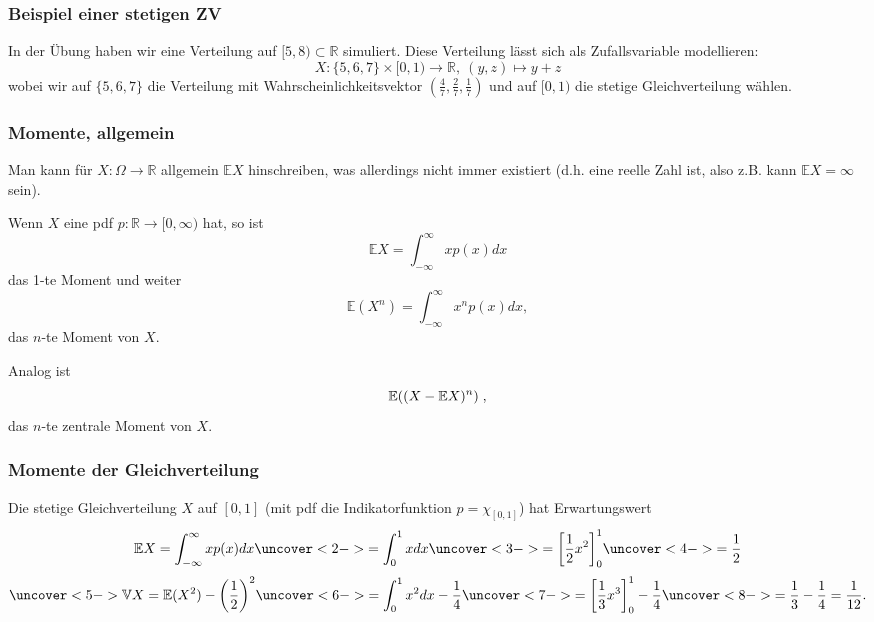 \begin{frame}
  \frametitle{Beispiel einer stetigen ZV}
  \vspace{-0.5cm}
  In der Übung haben wir eine Verteilung auf $[5,8) \subset \mathbb{R}$ simuliert.
  Diese Verteilung lässt sich als Zufallsvariable modellieren:
  \[X \colon \{5,6,7\} \times [0,1) \to \mathbb{R},\ (y,z) \mapsto y+z\]
  wobei wir auf $\{5,6,7\}$ die Verteilung mit Wahrscheinlichkeitsvektor $(\frac{4}{7},\frac{2}{7},\frac{1}{7})$ und auf $[0,1)$ die stetige Gleichverteilung wählen.
  
  \smallskip

  \uncover<2->{
    Diese Verteilung hat eine pdf $p \colon [5,8) \to [0,\infty)$ mit
    \[p(x) = \begin{cases} \frac{4}{7} & 5 \leq x < 6 \\ \frac{2}{7} & 6 \leq x < 7 \\ \frac{1}{7} & 7 \leq x < 8 \end{cases} \]
    $P([5,6]) = \int_5^6 p(x)dx = \frac{4}{7} [x]_{x=5}^{x=6} = \frac{4}{7}$
    und $P([6,6.5]) = \int_6^{6.5} p(x)dx = \frac{2}{7} \cdot \frac{1}{2} = \frac{1}{7}$.
    }
\end{frame}

\begin{frame}
  \frametitle{Momente, allgemein}
  \vspace{-0.7cm}
  Man kann für $X \colon \Omega \to \mathbb{R}$ allgemein $\mathbb{E}X$ hinschreiben, was allerdings nicht immer existiert (d.h. eine reelle Zahl ist, also z.B. kann $\mathbb{E}X=\infty$ sein).
  
  \smallskip
  
  Wenn $X$ eine pdf $p \colon \mathbb{R} \to [0,\infty)$ hat, so ist
  \[\mathbb{E}X = \int_{-\infty}^\infty x p(x) dx\]
  das 1-te Moment und weiter
  \[\mathbb{E}\left(X^n\right) = \int_{-\infty}^\infty x^n p(x) dx,\]
  das $n$-te Moment von $X$.
  
  \medskip\pause
  
  Analog ist
  \[\mathbb{E}((X - \mathbb{E} X)^n)\;,\]
  das $n$-te zentrale Moment von $X$.
\end{frame}

\begin{frame}
  \frametitle{Momente der Gleichverteilung}
  Die stetige Gleichverteilung $X$ auf $[0,1]$ (mit pdf die Indikatorfunktion $p = \chi_{[0,1]}$) hat Erwartungswert
  \[\mathbb{E}X = \int_{-\infty}^\infty x p(x) dx\uncover<2->{ = \int_0^1 x dx }\uncover<3->{ = {\left[ \frac{1}{2} x^2 \right]}_0^1} \uncover<4->{ = \frac{1}{2}}\]
  \[\uncover<5->{\mathbb{V}X = \mathbb{E}(X^2) - {\left(\frac{1}{2}\right)}^2} \uncover<6->{ = \int_0^1 x^2 dx - \frac{1}{4}} \uncover<7->{ = {\left[ \frac{1}{3} x^3 \right]}_0^1 - \frac{1}{4}} \uncover<8->{ = \frac{1}{3} - \frac{1}{4} = \frac{1}{12}.}\]
\end{frame}

